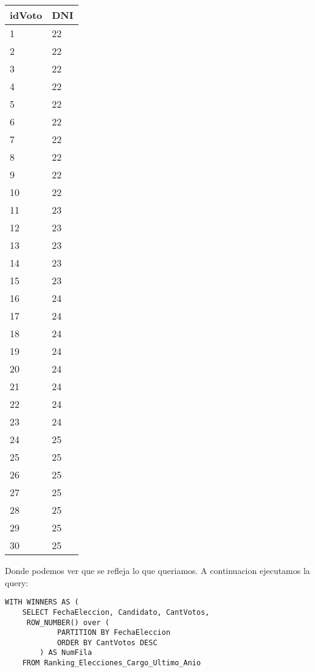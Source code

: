 \begin{itemize}
\vspace{2mm}	
 	
 \begin{tabular}{| l| l|}
	\hline 
	    idVoto & DNI \\
	  \hline 
	   1 &22  \\
	   \hline 
	   2 &22  \\
	   \hline 
	   3 &22  \\
	   \hline 
	   4 &22  \\
	   \hline 
	   5 &22  \\
	   \hline 
	   6 &22  \\
	   \hline 
	   7 &22  \\
	   \hline 
	   8 &22  \\
	   \hline 
	   9 &22  \\
	   \hline 
	   10 &22  \\
	   \hline 
	   11 &23  \\
	   \hline 
	   12 &23  \\
	   \hline 
	   13 &23  \\
	    \hline 
	   14 &23  \\
	   \hline 
	   15 &23  \\
	   \hline 
	   16 &24  \\
	   \hline 
	   17 &24  \\
	   \hline 
	   18 &24  \\
	   \hline 
	   19 &24  \\	 
	     \hline 
	   20 &24  \\	 
	     \hline 
	   21 &24  \\
	   \hline 
	   22 &24  \\	
	      \hline 
	   23 &24  \\	 
	     \hline 
	   24 &25  \\
	   \hline 
	   25 &25  \\	  
	    \hline 
	   26 &25  \\	  
	    \hline 
	   27 &25  \\	  
	    \hline 
	   28 &25  \\	 
	     \hline 
	   29 &25  \\	 
	     \hline 
	   30 &25  \\
	   \hline 
	\end{tabular}
	\vspace{2mm}	

Donde podemos ver que se refleja lo que queriamos. A continuacion ejecutamos la query:


\begin{lstlisting}
WITH WINNERS AS (
	SELECT FechaEleccion, Candidato, CantVotos,
	 ROW_NUMBER() over (
	        PARTITION BY FechaEleccion
	        ORDER BY CantVotos DESC
	    ) AS NumFila
	FROM Ranking_Elecciones_Cargo_Ultimo_Anio


\end{lstlisting}
\end{itemize}
